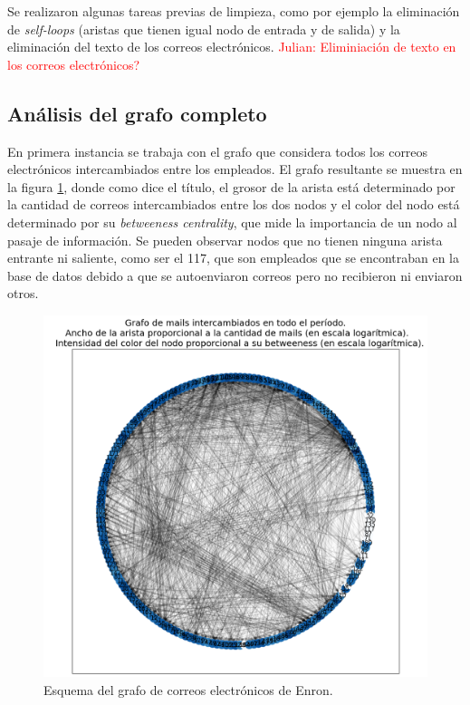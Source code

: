 \documentclass{article}
\begin{document}
Se realizaron algunas tareas previas de limpieza, como por ejemplo la eliminación de \textit{self-loops} (aristas que tienen igual nodo de entrada y de salida) y la eliminación del texto de los correos electrónicos.
\textcolor{red}{Julian: Eliminiación de texto en los correos electrónicos?}

\subsection{Análisis del grafo completo}
En primera instancia se trabaja con el grafo que considera todos los correos electrónicos intercambiados entre los empleados. El grafo resultante se muestra en la figura \ref{fig:grafo}, donde como dice el título, el grosor de la arista está determinado por la cantidad de correos intercambiados entre los dos nodos y el color del nodo está determinado por su \textit{betweeness centrality}, que mide la importancia de un nodo al pasaje de información. Se pueden observar nodos que no tienen ninguna arista entrante ni saliente, como ser el 117, que son empleados que se encontraban en la base de datos debido a que se autoenviaron correos pero no recibieron ni enviaron otros.

\begin{figure}[htb]
    \centering
    \includegraphics[width=0.8\linewidth]{imagenes/ej1/grafo.png}
    \caption{Esquema del grafo de correos electrónicos de Enron.}
    \label{fig:grafo}
\end{figure}
\end{document}
